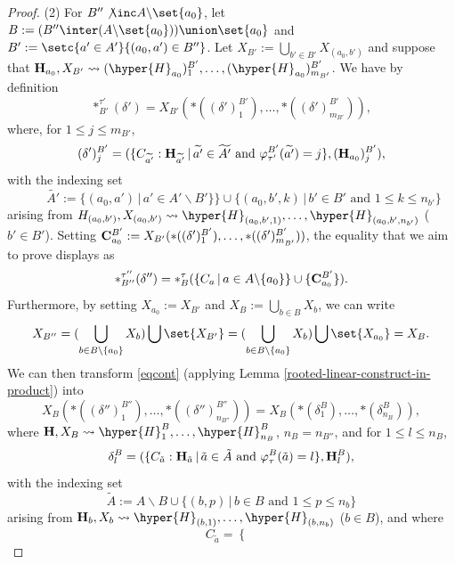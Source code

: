 \begin{proof}
\medskip\noindent
(2) For $B''\not\inc A\backslash\set{a_0}$, let  ${B}:=(B''\inter(A\backslash\set{a_0}))\union \set{a_0}$ and ${B'}:=\setc{a'\in A'}{(a_0,a')\in B''}$.   Let $X_{{B'}}:=\bigcup_{b'\in {B'}} X_{(a_0,b')}$ and suppose that  ${\bf H}_{a_0}, X_{{B'}}\leadsto (\hyper{H}_{a_0})_1^{{B'}},\dots,(\hyper{H}_{a_0})^{{B'}}_{m_{{B'}}}$.  We have by definition
$$\ast_{B'}^{\tau'}(\delta')=X_{{B'}}(\ast((\delta')^{{B'}}_1),\dots,\ast((\delta')^{{B'}}_{m_{{B'}}})),$$
where, for $1\leq j\leq m_{{B'}}$, 
$$(\delta')^{{B'}}_{j}=(\{C_{\widetilde{a'}}:{\bf H}_{\widetilde{a'}}\,|\, \widetilde{a'}\in \widetilde{A'} \mbox{ and } \varphi_{\tau'}^{{B'}}(\widetilde{a'})=j\},({\bf H}_{a_0})^{{B'}}_{j}),$$
with the indexing set 
$$\quad\quad\widetilde{A'}:=\{(a_0,a')\,|  \,a'\in A'\backslash B'\}\} 
\cup \{(a_0,b',k)\,|\, b'\in B' \text{ and } 1\leq k\leq n_{b'}\}$$
arising from  $H_{(a_0,b')}, X_{(a_0,b')}\leadsto \hyper{H}_{(a_0,b',1)},\dots,\hyper{H}_{(a_0,b',n_{b'})}$ ($b'\in B'$). Setting  ${\bf C}^{B'}_{a_0}:=X_{B'}(\ast((\delta')^{B'}_1),\dots,\ast((\delta')^{B'}_{m_{B'}}))$, the equality that we aim to prove displays as  
\begin{equation}
\label{eqcont}
\ast_{B''}^{\tau''}(\delta'')=\ast_{B}^{\tau}(\{C_a\,|\, a\in A\backslash\{a_0\}\}\cup\{{\bf C}^{B'}_{a_0}\}).
\end{equation}
Furthermore, by setting $X_{a_0}:=X_{{B'}}$ and $X_{{B}}:= \bigcup_{b\in {B}}X_b$, we can write 
$$X_{B''}=(\bigcup_{b\in {B}\backslash\{a_0\}}X_b)\bigcup \set{X_{{B'}}}= (\bigcup_{b\in {B}\backslash\{a_0\}}X_b)\bigcup \set{X_{a_0}} =
X_{{B}}.$$
We can then  transform \eqref{eqcont}  (applying Lemma \ref{rooted-linear-construct-in-product})
into 
\begin{equation}
X_{B}(\ast((\delta'')^{B''}_1),\dots,\ast((\delta'')^{B''}_{n_{B''}}))=  
X_{{B}}(\ast(\delta^{{B}}_1),\dots,\ast(\delta^{{B}}_{n_{{B}}})),
\end{equation}
where
${\bf H}, X_{{B}}\leadsto \hyper{H}_1^{{B}},\dots,\hyper{H}^{{B}}_{n_{{B}}}$, $n_{{B}}=n_{B''}$, and
for $1\leq l\leq n_{{B}}$, 
$$\delta^B_l=(\{C_{\tilde{a}}:{\bf H}_{\tilde{a}}\,|\, \tilde{a}\in\tilde{A} \mbox{ and } \varphi_{\tau}^{{B}}(\tilde{a})=l\},{\bf H}^{{B}}_l),$$
with the indexing set 
$$\tilde{A}:=A\backslash {B}\cup\{(b,p)\,|\, b\in {B} \mbox{ and } 1\leq p\leq n_b\}$$
arising from ${\bf H}_b, X_b\leadsto \hyper{H}_{(b,1)},\dots,\hyper{H}_{(b,n_b)}$ ($b\in {B}$),
and where 
$$C_{\tilde{a}}=\begin{cases}

\end{cases}$$
\end{proof}
